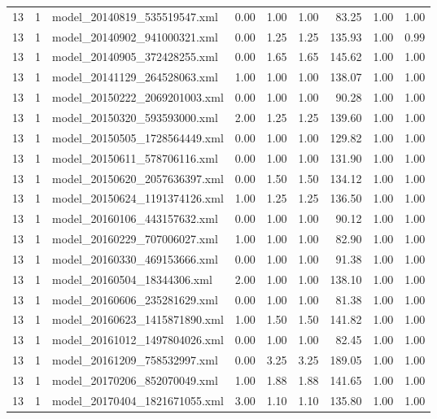 \begin{table}[ht]
\begin{tabular}{rrlrrrrrr}
   13 &   1 & model\_20140819\_535519547.xml & 0.00 & 1.00 & 1.00 & 83.25 & 1.00 & 1.00 \\ 
   13 &   1 & model\_20140902\_941000321.xml & 0.00 & 1.25 & 1.25 & 135.93 & 1.00 & 0.99 \\ 
   13 &   1 & model\_20140905\_372428255.xml & 0.00 & 1.65 & 1.65 & 145.62 & 1.00 & 1.00 \\ 
   13 &   1 & model\_20141129\_264528063.xml & 1.00 & 1.00 & 1.00 & 138.07 & 1.00 & 1.00 \\ 
   13 &   1 & model\_20150222\_2069201003.xml & 0.00 & 1.00 & 1.00 & 90.28 & 1.00 & 1.00 \\ 
   13 &   1 & model\_20150320\_593593000.xml & 2.00 & 1.25 & 1.25 & 139.60 & 1.00 & 1.00 \\ 
   13 &   1 & model\_20150505\_1728564449.xml & 0.00 & 1.00 & 1.00 & 129.82 & 1.00 & 1.00 \\ 
   13 &   1 & model\_20150611\_578706116.xml & 0.00 & 1.00 & 1.00 & 131.90 & 1.00 & 1.00 \\ 
   13 &   1 & model\_20150620\_2057636397.xml & 0.00 & 1.50 & 1.50 & 134.12 & 1.00 & 1.00 \\ 
   13 &   1 & model\_20150624\_1191374126.xml & 1.00 & 1.25 & 1.25 & 136.50 & 1.00 & 1.00 \\ 
   13 &   1 & model\_20160106\_443157632.xml & 0.00 & 1.00 & 1.00 & 90.12 & 1.00 & 1.00 \\ 
   13 &   1 & model\_20160229\_707006027.xml & 1.00 & 1.00 & 1.00 & 82.90 & 1.00 & 1.00 \\ 
   13 &   1 & model\_20160330\_469153666.xml & 0.00 & 1.00 & 1.00 & 91.38 & 1.00 & 1.00 \\ 
   13 &   1 & model\_20160504\_18344306.xml & 2.00 & 1.00 & 1.00 & 138.10 & 1.00 & 1.00 \\ 
   13 &   1 & model\_20160606\_235281629.xml & 0.00 & 1.00 & 1.00 & 81.38 & 1.00 & 1.00 \\ 
   13 &   1 & model\_20160623\_1415871890.xml & 1.00 & 1.50 & 1.50 & 141.82 & 1.00 & 1.00 \\ 
   13 &   1 & model\_20161012\_1497804026.xml & 0.00 & 1.00 & 1.00 & 82.45 & 1.00 & 1.00 \\ 
   13 &   1 & model\_20161209\_758532997.xml & 0.00 & 3.25 & 3.25 & 189.05 & 1.00 & 1.00 \\ 
   13 &   1 & model\_20170206\_852070049.xml & 1.00 & 1.88 & 1.88 & 141.65 & 1.00 & 1.00 \\ 
   13 &   1 & model\_20170404\_1821671055.xml & 3.00 & 1.10 & 1.10 & 135.80 & 1.00 & 1.00 \\ 

\end{tabular}
\end{table}
